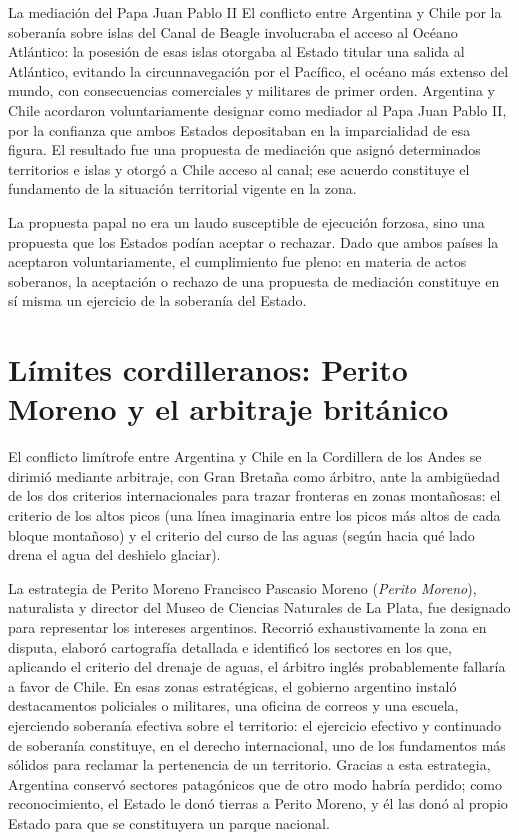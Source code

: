 \documentclass[12pt,oneside]{book}
\begin{document}
\begin{ejemplo}{La mediación del Papa Juan Pablo II}
El conflicto entre Argentina y Chile por la soberanía sobre islas del Canal de Beagle involucraba el acceso al Océano Atlántico: la posesión de esas islas otorgaba al Estado titular una salida al Atlántico, evitando la circunnavegación por el Pacífico, el océano más extenso del mundo, con consecuencias comerciales y militares de primer orden. Argentina y Chile acordaron voluntariamente designar como mediador al Papa Juan Pablo II, por la confianza que ambos Estados depositaban en la imparcialidad de esa figura. El resultado fue una propuesta de mediación que asignó determinados territorios e islas y otorgó a Chile acceso al canal; ese acuerdo constituye el fundamento de la situación territorial vigente en la zona.
\end{ejemplo}

\begin{nota}
La propuesta papal no era un laudo susceptible de ejecución forzosa, sino una propuesta que los Estados podían aceptar o rechazar. Dado que ambos países la aceptaron voluntariamente, el cumplimiento fue pleno: en materia de actos soberanos, la aceptación o rechazo de una propuesta de mediación constituye en sí misma un ejercicio de la soberanía del Estado.
\end{nota}

\section{Límites cordilleranos: Perito Moreno y el arbitraje británico}

El conflicto limítrofe entre Argentina y Chile en la Cordillera de los Andes se dirimió mediante arbitraje, con Gran Bretaña como árbitro, ante la ambigüedad de los dos criterios internacionales para trazar fronteras en zonas montañosas: el criterio de los altos picos (una línea imaginaria entre los picos más altos de cada bloque montañoso) y el criterio del curso de las aguas (según hacia qué lado drena el agua del deshielo glaciar).

\begin{ejemplo}{La estrategia de Perito Moreno}
Francisco Pascasio Moreno (\emph{Perito Moreno}), naturalista y director del Museo de Ciencias Naturales de La Plata, fue designado para representar los intereses argentinos. Recorrió exhaustivamente la zona en disputa, elaboró cartografía detallada e identificó los sectores en los que, aplicando el criterio del drenaje de aguas, el árbitro inglés probablemente fallaría a favor de Chile. En esas zonas estratégicas, el gobierno argentino instaló destacamentos policiales o militares, una oficina de correos y una escuela, ejerciendo soberanía efectiva sobre el territorio: el ejercicio efectivo y continuado de soberanía constituye, en el derecho internacional, uno de los fundamentos más sólidos para reclamar la pertenencia de un territorio. Gracias a esta estrategia, Argentina conservó sectores patagónicos que de otro modo habría perdido; como reconocimiento, el Estado le donó tierras a Perito Moreno, y él las donó al propio Estado para que se constituyera un parque nacional.
\end{ejemplo}
\end{document}
